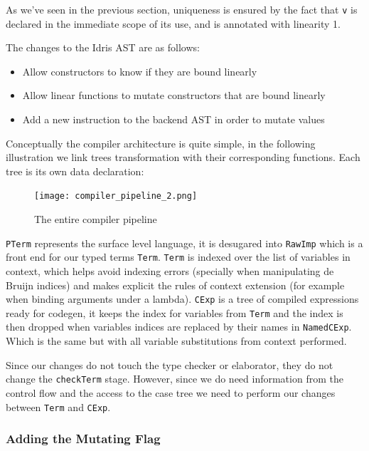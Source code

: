 \documentclass[
]{article}
\providecommand{\tightlist}{%
  \setlength{\itemsep}{0pt}\setlength{\parskip}{0pt}}
\begin{document}
As we've seen in the previous section, uniqueness is ensured by the fact
that \texttt{v} is declared in the immediate scope of its use, and is
annotated with linearity 1.

The changes to the Idris AST are as follows:

\begin{itemize}
\tightlist
\item
  Allow constructors to know if they are bound linearly
\item
  Allow linear functions to mutate constructors that are bound linearly
\item
  Add a new instruction to the backend AST in order to mutate values
\end{itemize}

Conceptually the compiler architecture is quite simple, in the following
illustration we link trees transformation with their corresponding
functions. Each tree is its own data declaration:

\begin{figure}
\centering
\texttt{[image: compiler\_pipeline\_2.png]}
\caption{The entire compiler pipeline}
\end{figure}

\texttt{PTerm} represents the surface level language, it is desugared
into \texttt{RawImp} which is a front end for our typed terms
\texttt{Term}. \texttt{Term} is indexed over the list of variables in
context, which helps avoid indexing errors (specially when manipulating
de Bruijn indices) and makes explicit the rules of context extension
(for example when binding arguments under a lambda). \texttt{CExp} is a
tree of compiled expressions ready for codegen, it keeps the index for
variables from \texttt{Term} and the index is then dropped when
variables indices are replaced by their names in \texttt{NamedCExp}.
Which is the same but with all variable substitutions from context
performed.

Since our changes do not touch the type checker or elaborator, they do
not change the \texttt{checkTerm} stage. However, since we do need
information from the control flow and the access to the case tree we
need to perform our changes between \texttt{Term} and \texttt{CExp}.

\hypertarget{adding-the-mutating-flag}{%
\subsubsection{Adding the Mutating
Flag}\label{adding-the-mutating-flag}}
\end{document}
